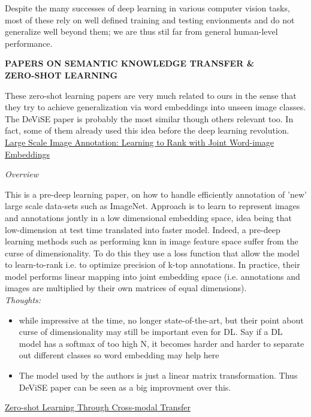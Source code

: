 \documentclass[12pt]{report}
\begin{document}
Despite the many successes of deep learning in various computer vision tasks, most of these rely on well defined training and testing envionments and do not generalize well beyond them; we are thus stil far from general human-level performance.

\newpage

\textbf{PAPERS ON SEMANTIC KNOWLEDGE TRANSFER \& \\ZERO-SHOT LEARNING}

These zero-shot learning papers are very much related to ours in the sense that they try to achieve generalization via word embeddings into unseen image classes. The DeViSE paper is probably the most similar though others relevant too. In fact, some of them already used this idea before the deep learning revolution.\\

\underline{Large Scale Image Annotation: Learning to Rank with Joint Word-image Embeddings \cite{Weston2010}}

\textit{Overview}

This is a pre-deep learning paper, on how to handle efficiently annotation of 'new' large scale data-sets such as ImageNet.  Approach is to learn to represent images and annotations jontly in a low dimensional embedding space, idea being that low-dimension at test time translated into faster model. Indeed, a pre-deep learning methods such as performing knn in image feature space suffer from the curse of dimensionality.  To do this they use a loss function that allow the model to learn-to-rank i.e. to optimize precision of k-top annotations. In practice, their model performs linear mapping into joint embedding space (i.e. annotations and images are multiplied by their own matrices of equal dimensions). \\
\textit{Thoughts:}
\begin{itemize}
    \item while impressive at the time, no longer state-of-the-art, but their point about curse of dimensionality may still be important even for DL. Say if a DL model has a softmax of too high N, it becomes harder and harder to separate out different classes so word embedding may help here
    \item The model used by the authors is just a linear matrix transformation. Thus DeViSE paper can be seen as a big improvment over this. \\
  \end{itemize}

\underline{Zero-shot Learning Through Cross-modal Transfer \cite{Socher}}
\end{document}
